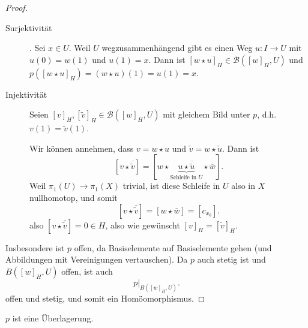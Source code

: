 \begin{proof}
    \begin{description}
        \item[Surjektivität]. Sei $x\in U$. Weil $U$ wegzusammenhängend gibt es einen Weg  $u\colon  I \to  U$ mit $u(0) = w(1)$ und  $u(1) = x$. Dann ist  $[w \star u]_H \in  \mathcal{B}([w]_H, U)$ und $p([w \star u]_H) = ( w \star u) (1) = u(1) = x$. 
        \item[Injektivität] Seien $[v]_H, [\tilde{v}]_H\in \mathcal{B}([w]_H, U)$ mit gleichem Bild unter $p$, d.h.  $v(1) = \tilde{v}(1)$.

            Wir können annehmen, dass $v = w \star u$ und  $\tilde{v} = w \star \tilde{u}$. Dann ist
            \[
                [ v \star \overline{\tilde{v}}] = [ w \star \underbrace{u \star \overline{\tilde{u}}}_{\text{Schleife in $U$}}\star \overline{w}]
            .\] 
            Weil $\pi_1(U) \to  \pi_1(X)$ trivial, ist diese Schleife in $U$ also in  $X$ nullhomotop, und somit
             \[
                 [v \star \overline{\tilde{v}}] = [ w \star \overline{w}] = [c_{x_0}]
            .\] 
            also $[v \star \overline{\tilde{v}}] = 0 \in H$, also wie gewünscht $[v]_H = [\tilde{v}]_H$.
    \end{description}
    Insbesondere ist $p$ offen, da  Basiselemente auf Basiselemente gehen (und Abbildungen mit Vereinigungen vertauschen). Da $p$ auch stetig ist und  $B([w]_H, U)$ offen, ist auch 
     \[
         p|_{B([w]_H, U)}
    .\] 
    offen und stetig, und somit ein Homöomorphismus.
\end{proof}

\begin{proposition}
    $p$ ist eine Überlagerung.
\end{proposition}

